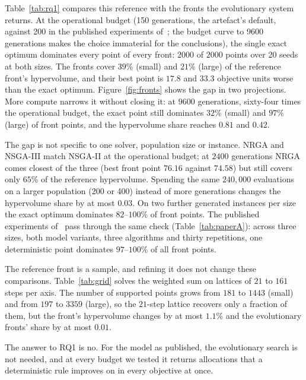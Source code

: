 \documentclass[systems,article,accept,moreauthors,pdftex]{Definitions/mdpi}
\begin{document}
Table~\ref{tab:rq1} compares this reference with the fronts the evolutionary system
returns. At the operational budget (150 generations, the artefact's default, against 200 in the
published experiments of~\cite{rabiei2026resilient}; the budget curve to 9600 generations makes the
choice immaterial for the conclusions), the
single exact optimum dominates every point of every front: $2000$ of $2000$ points over
20 seeds at both sizes. The fronts cover $39\%$ (small) and $21\%$ (large) of the reference
front's hypervolume, and their best point is $17.8$ and $33.3$ objective units worse than the
exact optimum. Figure~\ref{fig:fronts} shows the gap in two projections.
More compute narrows it without closing it: at $9600$ generations, sixty-four times the
operational budget, the exact point still dominates $32\%$ (small) and $97\%$ (large) of
front points, and the hypervolume share reaches $0.81$ and $0.42$.

The gap is not specific to one solver, population size or instance. NRGA and NSGA-III
match NSGA-II at the operational budget; at $2400$ generations NRGA comes closest of the
three (best front point $76.16$ against $74.58$) but still covers only $65\%$ of the reference
hypervolume. Spending the same $240{,}000$ evaluations on a larger population (200 or 400)
instead of more generations changes the hypervolume share by at most $0.03$. On \linebreak  two further
generated instances per size the exact optimum dominates $82$--$100\%$ of front points.
The published experiments of~\cite{rabiei2026resilient} pass through the same check
(Table~\ref{tab:paperA}): across three sizes, both model variants, three algorithms and
thirty repetitions, one deterministic point dominates $97$--$100\%$ of all front points.

The reference front is a sample, and refining it does not change these comparisons.
Table~\ref{tab:grid} solves the weighted sum on lattices of $21$ to $161$ steps per axis. The
number of supported points grows from $181$ to $1443$ (small) and from $197$ to $3359$ (large),
so the $21$-step lattice recovers only a fraction of them, but the front's hypervolume changes
by at most $1.1\%$ and the evolutionary fronts' share by at most $0.01$.

The answer to RQ1 is no. For the model as published, the evolutionary search is not needed,
and at every budget we tested it returns allocations that a deterministic rule improves on
in every objective at once.
\end{document}
